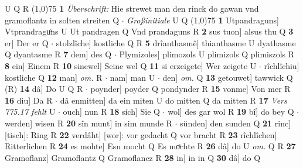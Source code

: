 \documentclass[8pt,a4paper,notitlepage]{article}
\begin{document}
\begin{table}[ht]
\begin{minipage}[t]{0.5\linewidth}
U Q R \newline
\line(1,0){75} \newline
\textbf{1} \textit{Überschrift:} Hie strewet man den rinck do gawan vnd gramoflantz in solten streiten Q   $\cdot$ \textit{Großinitiale} U Q  \newline
\line(1,0){75} \newline
\textbf{1} Utpandraguns] Vtprandraguͦns U Ut pandragen Q Vnd prandaguns R \textbf{2} sus tuon] alsus thu Q \textbf{3} er] Der er Q  $\cdot$ stolzlîche] kostliche Q R \textbf{5} drîanthasmê] thianthasme U dyathasme Q dyantasme R \textbf{7} dem] des Q  $\cdot$ Plymizoles] plimozols U plimizols Q plimiszols R \textbf{8} ein] Einem R \textbf{10} sinewel] Seine wel Q \textbf{11} si erzeigete] Wer zeigete U  $\cdot$ rîchlîchiu] kostliche Q \textbf{12} man] \textit{om.} R  $\cdot$ nam] man U  $\cdot$ den] \textit{om.} Q \textbf{13} getouwet] tawwick Q (R) \textbf{14} dâ] Do U Q R  $\cdot$ poynder] poyder Q pondynder R \textbf{15} vonme] Von mer R \textbf{16} diu] Da R  $\cdot$ dâ enmitten] da ein miten U do mitten Q da mitten R \textbf{17} \textit{Vers 775.17 fehlt} U   $\cdot$ ouch] nun R \textbf{18} sich] Sie Q  $\cdot$ wol] des gar wol R \textbf{19} bî] do bey Q  $\cdot$ werden] wisen R \textbf{20} sîn munt] in sim munde R  $\cdot$ sünden] den sunden Q \textbf{21} rinc] [tisch]: Ring R \textbf{22} verdâht] [wor]: vor gedacht Q vor bracht R \textbf{23} rîchlîchen] Ritterlichen R \textbf{24} es mohte] Esn mocht Q Es moͯchte R \textbf{26} dâ] do U \textit{om.} Q R \textbf{27} Gramoflanz] Gramoflantz Q Gramoflancz R \textbf{28} in] in in Q \textbf{30} dâ] do Q \newline
\end{minipage}
\end{table}
\end{document}
